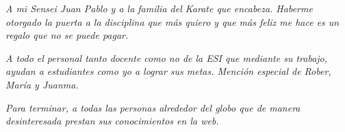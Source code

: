 \noindent\textit{A mi Sensei Juan Pablo y a la familia del Karate que encabeza. Haberme otorgado la puerta a la disciplina que más quiero y que más feliz me hace es un regalo que no se puede pagar.}
\vspace{4mm}

\noindent\textit{A todo el personal tanto docente como no de la ESI que mediante su trabajo, ayudan a estudiantes como yo a lograr sus metas. Mención especial de Rober, María y Juanma.}
\vspace{4mm}

\noindent\textit{Para terminar, a todas las personas alrededor del globo que de manera desinteresada prestan sus conocimientos en la web.}
\vspace{4mm}